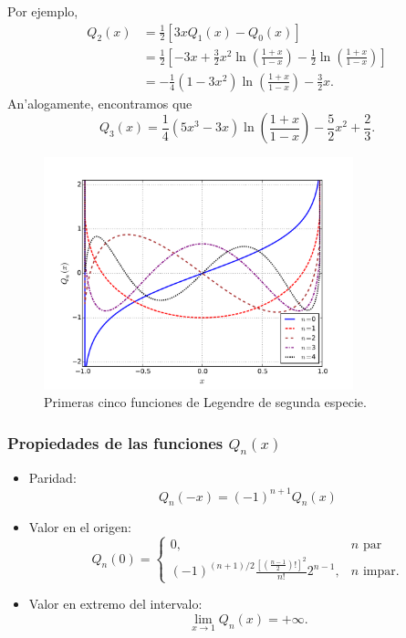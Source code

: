 Por ejemplo,
\begin{align}
Q_2(x) &= \frac{1}{2}\left[3xQ_1(x)-Q_0(x)\right] \\
&= \frac{1}{2}\left[-3x+\frac{3}{2}x^2\ln\left(\frac{1+x}{1-x}\right)-\frac{1}{2}\ln\left(\frac{1+x}{1-x}\right)\right] \\
&= -\frac{1}{4}(1-3x^2)\ln\left(\frac{1+x}{1-x}\right) -\frac{3}{2}x.
\end{align}
An'alogamente, encontramos que
\begin{equation}
Q_3(x)=\frac{1}{4}(5x^3-3x)\ln\left(\frac{1+x}{1-x}\right)-\frac{5}{2}x^2+\frac{2}{3}.
\end{equation}
\begin{figure}[H]
\centering
\includegraphics[angle=0,width=0.8\textwidth]{figs/fig-Legendre-Q.pdf}
\caption{Primeras cinco funciones de Legendre de segunda especie.}
\label{fig-Qn}
\end{figure}

\subsubsection{Propiedades de las funciones $Q_n(x)$}
\begin{itemize}
\item Paridad:
\begin{equation}
Q_n(-x)=(-1)^{n+1}Q_n(x)
\end{equation}

\item Valor en el origen:
\begin{equation}
Q_n(0)=
\begin{cases}
0, &  n\text{ par} \\
(-1)^{(n+1)/2}\frac{\left[\left(\frac{n-1}{2}\right)!\right]^2}{n!}2^{n-1}, & n\text{ impar}.
\end{cases}
\end{equation}

\item Valor en extremo del intervalo:
\begin{equation}
\lim_{x\to 1}Q_n(x)=+\infty .
\end{equation}
\end{itemize}



